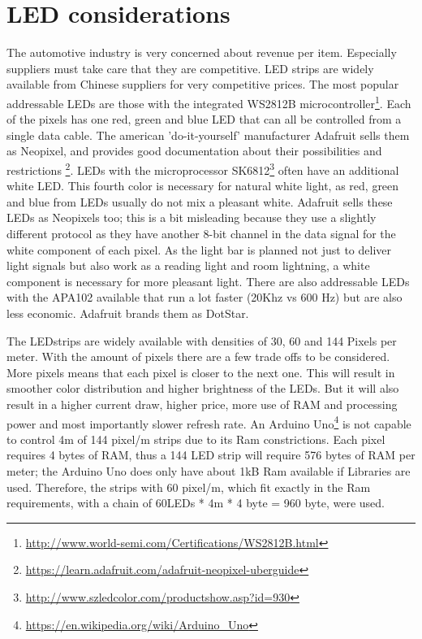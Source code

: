 \section{LED considerations}
\label{sec:LEDconsiderations}
The automotive industry is very concerned about revenue per item. Especially suppliers must take care that they are competitive. LED strips are widely available from Chinese suppliers for very competitive prices. The most popular addressable LEDs are those with the integrated WS2812B microcontroller\footnote{\url{http://www.world-semi.com/Certifications/WS2812B.html}}. Each of the pixels has one red, green and blue LED that can all be controlled from a single data cable. The american 'do-it-yourself' manufacturer Adafruit sells them as Neopixel, and provides good documentation about their possibilities and restrictions \footnote{\url{https://learn.adafruit.com/adafruit-neopixel-uberguide}}. LEDs with the microprocessor SK6812\footnote{\url{http://www.szledcolor.com/productshow.asp?id=930}} often have an additional white LED. This fourth color is necessary for natural white light, as red, green and blue from LEDs usually do not mix a pleasant white. Adafruit sells these LEDs as Neopixels too; this is a bit misleading because they use a slightly different protocol as they have another 8-bit channel in the data signal for the white component of each pixel. As the light bar is planned not just to deliver light signals but also work as a reading light and room lightning, a white component is necessary for more pleasant light. There are also addressable LEDs with the APA102 available that run a lot faster (20Khz vs 600 Hz) but are also less economic. Adafruit brands them as DotStar. 

The LEDstrips are widely available with densities of 30, 60 and 144 Pixels per meter.
With the amount of pixels there are a few trade offs to be considered. More pixels means that each pixel is closer to the next one. This will result in smoother color distribution and higher brightness of the LEDs. But it will also result in a higher current draw, higher price, more use of RAM and processing power and most importantly slower refresh rate. An Arduino Uno\footnote{\url{https://en.wikipedia.org/wiki/Arduino_Uno}} is not capable to control 4m of 144 pixel/m strips due to its Ram constrictions. Each pixel requires 4 bytes of RAM,  thus a 144 LED strip will require 576 bytes of RAM per meter; the Arduino Uno does only have about 1kB Ram available if Libraries are used. Therefore, the strips with 60 pixel/m, which fit exactly in the Ram requirements, with a chain of 60LEDs * 4m * 4 byte = 960 byte, were used.

